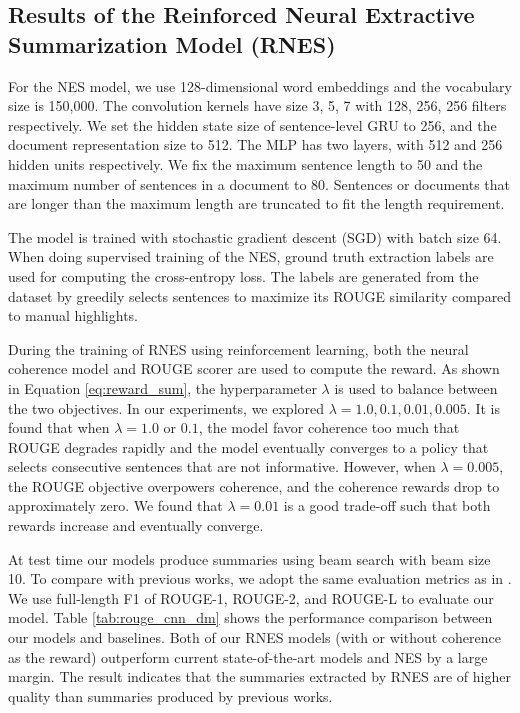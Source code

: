 \documentclass[letterpaper]{article} %
\begin{document}
	\subsection{Results of the Reinforced Neural Extractive Summarization Model (RNES)}
	For the NES model, we use 128-dimensional word embeddings and the vocabulary size is 150,000. The convolution kernels have size 3, 5, 7 with 128, 256, 256 filters respectively. We set the hidden state size of sentence-level GRU to 256, and the document representation size to 512. The MLP has two layers, with 512 and 256 hidden units respectively. We fix the maximum sentence length to 50 and the maximum number of sentences in a document to 80. Sentences or documents that are longer than the maximum length are truncated to fit the length requirement.
	
	The model is trained with stochastic gradient descent (SGD) with batch size 64. When doing supervised training of the NES, ground truth extraction labels are used for computing the cross-entropy loss. The labels are generated from the dataset by greedily selects sentences to maximize its ROUGE similarity compared to manual highlights.
	
	During the training of RNES using reinforcement learning, both the neural coherence model and ROUGE scorer are used to compute the reward. As shown in Equation \ref{eq:reward_sum}, the hyperparameter $\lambda$ is used to balance between the two objectives. In our experiments, we explored $\lambda=1.0, 0.1, 0.01, 0.005$. It is found that when $\lambda=1.0$ or $0.1$, the model favor coherence too much that ROUGE degrades rapidly and the model eventually converges to a policy that selects consecutive sentences that are not informative. However, when $\lambda = 0.005$, the ROUGE objective overpowers coherence, and the coherence rewards drop to approximately zero. We found that $\lambda=0.01$ is a good trade-off such that both rewards increase and eventually converge.
	
	At test time our models produce summaries using beam search with beam size 10. To compare with previous works, we adopt the same evaluation metrics as in \cite{SummaRuNNer}. We use full-length F1 of ROUGE-1, ROUGE-2, and ROUGE-L to evaluate our model. Table \ref{tab:rouge_cnn_dm} shows the performance comparison between our models and baselines. Both of our RNES models (with or without coherence as the reward) outperform current state-of-the-art models and NES by a large margin. The result indicates that the summaries extracted by RNES are of higher quality than summaries produced by previous works.
	
\end{document}
